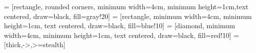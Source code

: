 \geometry{margin=1in}
\usetikzlibrary{shapes.geometric, arrows}

 = [rectangle, rounded corners, minimum width=4cm, minimum height=1cm,text centered, draw=black, fill=gray!20]
 = [rectangle, minimum width=4cm, minimum height=1cm, text centered, draw=black, fill=blue!10]
 = [diamond, minimum width=4cm, minimum height=1cm, text centered, draw=black, fill=red!10]
 = [thick,->,>=stealth]
\let\cleardoublepage\clearpage

\lstset{
  basicstyle=\footnotesize\ttfamily,
  breaklines=true,
  breakatwhitespace=true,
  frame=single,
  columns=fullflexible, %
  captionpos=b
}




